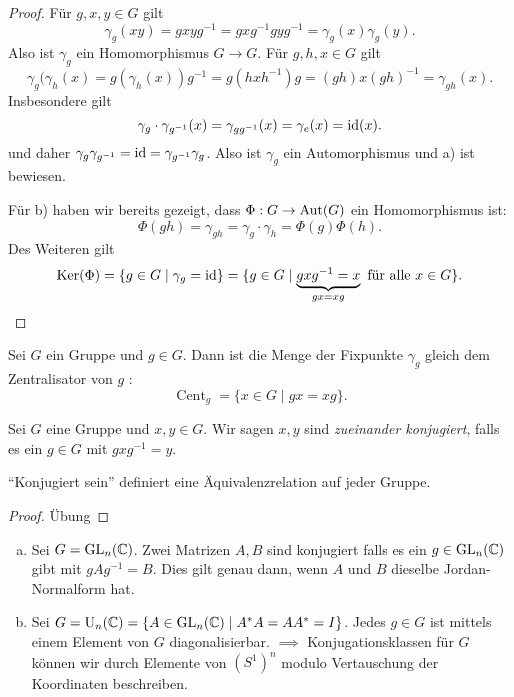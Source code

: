 \begin{proof}
	Für $g,x,y \in G$ gilt 
	\[
		\gamma_{g}(x y) = g x y g^{-1} = g x g^{-1} g y g^{-1} = \gamma_{g}(x) \gamma_{g}(y)
	.\]
	Also ist $\gamma_{g}$ ein Homomorphismus $G \to G$.
	Für $g,h,x \in G$ gilt 
	\[
		\gamma_{g}(\gamma_{h}(x) = g (\gamma_{h}(x)) g^{-1} = g (h x h^{-1}) g = (gh) x (gh)^{-1} = \gamma_{gh}(x)
	.\]
	Insbesondere gilt
	\[
		\gamma_{g} \cdot \gamma_{g^{-1}}(x) = \gamma_{g g^{-1}}(x) = \gamma_{e}(x) = \operatorname{id}(x)
	.\] 
	und daher $\gamma_{g} \gamma_{g^{-1}} = \operatorname{id} = \gamma_{g^{-1}} \gamma_{g}$.
	Also ist $\gamma_{g}$ ein Automorphismus und a) ist bewiesen.

	Für b) haben wir bereits gezeigt, dass $\Phi: G \to  \operatorname{Aut}(G)$ ein Homomorphismus ist:
	\[
		\Phi(gh) = \gamma_{gh} = \gamma_{g} \cdot \gamma_{h} = \Phi(g) \Phi(h)
	.\] 
	Des Weiteren gilt
	\[
		\operatorname{Ker}(\Phi) = \{g \in G \mid \gamma_{g} = \operatorname{id}\}  = \{g \in G \mid \underbrace{g x g^{-1} = x}_{gx = xg} \text{ für alle } x \in G\} 
	.\] 
\end{proof}

\begin{definition}
	Sei $G$ ein Gruppe und $g \in G$. Dann ist die Menge der Fixpunkte $\gamma_{g}$ gleich dem Zentralisator von $g$ :
	\[
		\operatorname{Cent}_{g} = \{x \in G \mid gx = xg\} 
	.\] 
\end{definition}

\begin{definition}
	Sei $G$ eine Gruppe und $x,y \in G$.
	Wir sagen $x,y$ sind \emph{zueinander konjugiert}, falls es ein $g \in G$ mit $g x g^{-1} = y$.
\end{definition}

\begin{lemma}
	\enquote{Konjugiert sein} definiert eine Äquivalenzrelation auf jeder Gruppe.
\end{lemma}

\begin{proof}
	Übung
\end{proof}

\begin{eg}
	\begin{enumerate}[a)]
		\item Sei $G = \operatorname{GL}_{n}(\mathbb{C})$. Zwei Matrizen $A,B$ sind konjugiert falls es ein $g \in \operatorname{GL}_{n}(\mathbb{C})$ gibt mit $g A g^{-1} = B$.
			Dies gilt genau dann, wenn $A$ und $B$ dieselbe Jordan-Normalform hat.
		\item Sei $G = \operatorname{U}_{n}(\mathbb{C}) = \{A \in \operatorname{GL}_{n}(\mathbb{C}) \mid A^{*} A = A A^{*} = I\} $.
			Jedes $g \in G$ ist mittels einem Element von $G$ diagonalisierbar.
			$\implies$ Konjugationsklassen für $G$ können wir durch Elemente von $(S^{1})^{n}$ modulo Vertauschung der Koordinaten beschreiben.
	\end{enumerate}
\end{eg}

